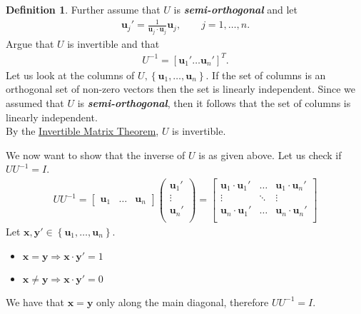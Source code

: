 \documentclass[paper=a4, fontsize=11pt]{scrartcl} %
\numberwithin{equation}{section} %
\numberwithin{figure}{section} %
\numberwithin{table}{section} %
\theoremstyle{definition}
\newtheorem*{definition}{Definition}
\begin{document}
\begin{definition}
Further assume that $U$ is \textbf{\textit{semi-orthogonal}} and let
\begin{align*}
  \mathbf{u}_j' = \frac{1}{\mathbf{u}_j\cdot\mathbf{u}_j}\mathbf{u}_j, \qquad j = 1,\dots,n.
\end{align*}
Argue that $U$ is invertible and that
\begin{align*}
  U^{-1} = \left[ \mathbf{u}_1' \dots \mathbf{u}_n' \right]^T.
\end{align*}
Let us look at the columns of $U, \left\{ \mathbf{u}_1,\dots,\mathbf{u}_n \right\}$.
If the set of columns is an orthogonal set of non-zero vectors then the set is linearly independent.
Since we assumed that $U$ is \textit{\textbf{semi-orthogonal}}, then it follows that the set of columns is linearly independent.\\
By the \underline{Invertible Matrix Theorem}, $U$ is invertible.

We now want to show that the inverse of $U$ is as given above.
Let us check if $UU^{-1} = I$.
\begin{align*}
  UU^{-1} = \begin{bmatrix}
	\mathbf{u}_1 & \hdots & \mathbf{u}_n
  \end{bmatrix} \begin{pmatrix}
	\mathbf{u}_1'\\
	\vdots\\
	\mathbf{u}_n'\\
  \end{pmatrix} = \begin{bmatrix}
	\mathbf{u}_1\cdot\mathbf{u}_1' & \hdots & \mathbf{u}_1\cdot\mathbf{u}_n'\\
	\vdots & \ddots & \vdots \\
	\mathbf{u}_n\cdot\mathbf{u}_1' & \hdots & \mathbf{u}_n\cdot\mathbf{u}_n'\\
  \end{bmatrix}
\end{align*}
Let $\mathbf{x}, \mathbf{y}' \in \left\{ \mathbf{u}_1, \dots, \mathbf{u}_n \right\}$.\\
\begin{itemize}
  \item $\mathbf{x} = \mathbf{y} \Rightarrow \mathbf{x}\cdot\mathbf{y}' = 1$
  \item $\mathbf{x} \neq \mathbf{y} \Rightarrow \mathbf{x}\cdot\mathbf{y}' = 0$
\end{itemize}
We have that $\mathbf{x} = \mathbf{y}$ only along the main diagonal, therefore $UU^{-1} = I$.


\end{definition}
\end{document}
